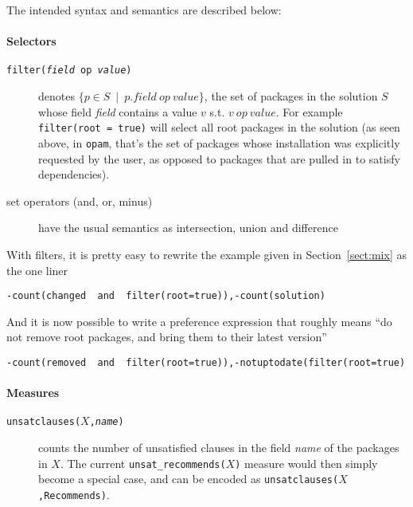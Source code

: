 \documentclass{article}
\begin{document}
The intended syntax and semantics are described below:

\paragraph{Selectors}
\begin{description}
  \item[\texttt{filter(\emph{field} op \emph{value})}] denotes $\{ p \in S ~\mid~  p.field ~op~ value \}$, the set of packages in the solution $S$ whose field \emph{field} contains a value $v$ s.t.
        $v~op~value$. For example  \texttt{filter(root = true)} will select all root packages in the solution (as seen above, in \texttt{opam}, that's the set of packages whose installation was explicitly
        requested by the user, as opposed to packages that are pulled in to satisfy dependencies).
  \item[set operators (and, or, minus)] have the usual semantics as intersection, union and difference
\end{description}


\noindent With filters, it is pretty easy to rewrite the example given in Section~\ref{sect:mix} as the one liner

\begin{center}
\texttt{-count(changed ~and~ filter(root=true)),-count(solution)}
\end{center}

And it is now possible to write a preference expression that roughly means
``do not remove root packages, and bring them to their latest version''

\begin{center}
\texttt{-count(removed ~and~ filter(root=true)),-notuptodate(filter(root=true)}
\end{center}

\paragraph{Measures}

\begin{description}
  \item[\texttt{unsatclauses($X$,\emph{name})}] counts the number of unsatisfied clauses in the field \emph{name} of the packages in $X$. 
The current \texttt{unsat\_recommends($X$)} measure would then simply become a special case, and can be encoded as \texttt{unsatclauses($X$,Recommends)}.
\end{description}
\end{document}
